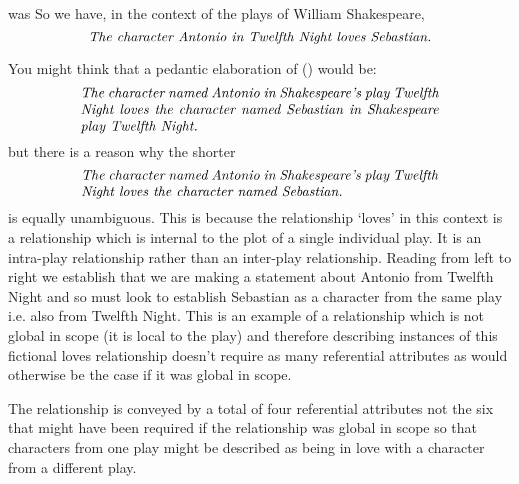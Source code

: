 \mynote was %
So we have, in the context of the plays of William Shakespeare,
\begin{equation}
\label{AntonioLovesSebastian2}
\mbox{\textit{The character Antonio in Twelfth Night loves Sebastian.}}
\end{equation} 

You might think that a pedantic elaboration of (\label{AntonioLovesSebastian}) would be:
\begin{equation}
\text{\parbox{9cm}{\textit{The character named Antonio in Shakespeare's play Twelfth Night loves the character named Sebastian in Shakespeare play Twelfth Night.}}}
\end{equation} 
but there is a reason why the shorter
\begin{equation}
\text{\parbox{9cm}{\textit{The character named Antonio in Shakespeare's play Twelfth Night loves the character named Sebastian.}}}
\end{equation} 
is equally unambiguous. This is because the relationship `loves' in this context is a relationship which is internal to the plot of a single individual play. 
It is an intra-play relationship rather than an inter-play relationship.
Reading from left to right we establish that we are making a statement about 
Antonio from Twelfth Night  and so must look to establish Sebastian as a character from the same play i.e. also from Twelfth Night. This is an example of a relationship which is not global in scope (it is local to the play) and therefore describing instances of this fictional loves relationship
doesn't require as many referential attributes as would otherwise be the case if it was global in scope. 

The relationship is conveyed by a total of four referential attributes
 not the six that might have been required
if the relationship was global in scope so that characters from one play might be described as being in love with a character from a different play.


